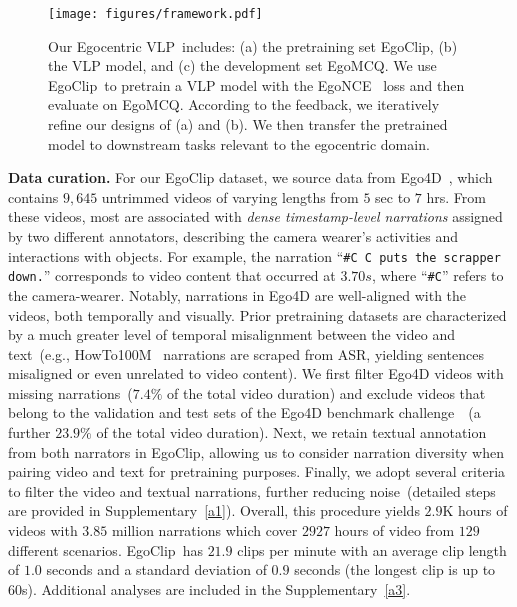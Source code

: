 \documentclass{article}
\newcommand{\vlp}{Egocentric VLP}
\newcommand{\dataset}{EgoClip}
\newcommand{\model}{EgoNCE\xspace}
\newcommand{\eval}{EgoMCQ}
\begin{document}
\begin{figure}[!t]
	\centering
	\vspace{-1.5em}
	\texttt{[image: figures/framework.pdf]}
	\vspace{-1.em}
	\caption{
	Our \vlp~includes: (a) the pretraining set \dataset, (b) the VLP model, and (c) the development set \eval. We use \dataset~to pretrain a VLP model with the \model~ loss and then evaluate on \eval. According to the feedback, we iteratively refine our designs of (a) and (b). We then transfer the pretrained model to downstream tasks relevant to the egocentric domain.}
	\vspace{-1.5em}
	\label{framework}
\end{figure}

\textbf{Data curation.}
For our \dataset{} dataset, we source data from Ego4D~\cite{grauman2021ego4d}, which contains $9,645$ untrimmed videos of varying lengths from $5$ sec to $7$ hrs. From these videos, most are associated with \textit{dense timestamp-level narrations} assigned by two different annotators, describing the camera wearer's activities and interactions with objects. For example, the narration ``{\texttt{\#C C puts the scrapper down.}}'' corresponds to video content that occurred at {$3.70s$}, where  ``\texttt{\#C}'' refers to the camera-wearer.
Notably, narrations in Ego4D are well-aligned with the videos, both temporally and visually.
Prior pretraining datasets are characterized by a much greater level of temporal misalignment between the video and text~(e.g., HowTo100M~\cite{miech2019howto100m} narrations are scraped from ASR, yielding sentences misaligned or even unrelated to video content).
We first filter Ego4D videos with missing narrations~($7.4\%$ of the total video duration) and exclude videos that belong to the validation and test sets of the Ego4D benchmark challenge~\cite{grauman2021ego4d}~(a further $23.9\%$ of the total video duration). Next, we retain textual annotation from both narrators in \dataset, allowing us to consider narration diversity when pairing video and text for pretraining purposes. Finally, we adopt several criteria to filter the video and textual narrations, further reducing noise~(detailed steps are provided in Supplementary~\ref{a1}). Overall, this procedure yields $2.9$K hours of videos with $3.85$ million narrations which cover $2927$ hours of video from $129$ different scenarios. \dataset~has $21.9$ clips per minute with an average clip length of $1.0$ seconds and a standard deviation of $0.9$ seconds (the longest clip is up to $60$s). Additional analyses are included in the Supplementary~\ref{a3}.
\end{document}
